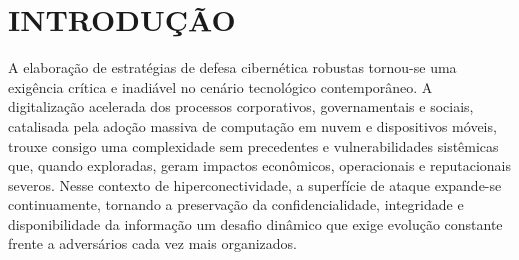 \documentclass[12pt,oneside]{abntex2}
\begin{document}
\pagestyle{tccright}

\pretextual
\begin{capa}
\begin{center}
\bfseries\imprimirinstituicao

\vfill
\textbf{\imprimirautor}

\vfill
{\fontsize{16pt}{19pt}\selectfont\bfseries\imprimirtitulo\par}

\vfill
\imprimirlocal
\par
\imprimirdata
\end{center}
\end{capa}

\begin{folhaderosto}
\thispagestyle{empty}
\setcounter{page}{2}
\begin{center}
\textbf{\imprimirinstituicao}

\vfill
\textbf{\imprimirautor}

\vfill
{\fontsize{16pt}{19pt}\selectfont\bfseries\imprimirtitulo\par}

\vfill
\hfill
\begin{minipage}{0.5\textwidth}
\SingleSpacing
\imprimirpreambulo
\end{minipage}

\vfill
\imprimirlocal
\par
\imprimirdata
\end{center}
\end{folhaderosto}

\tableofcontents*
\cleardoublepage

\textual
\OnehalfSpacing
\linespread{1.5}\selectfont
\pagestyle{tccright}

\chapter{INTRODUÇÃO}

A elaboração de estratégias de defesa cibernética robustas tornou-se uma exigência crítica e inadiável no cenário tecnológico contemporâneo. A digitalização acelerada dos processos corporativos, governamentais e sociais, catalisada pela adoção massiva de computação em nuvem e dispositivos móveis, trouxe consigo uma complexidade sem precedentes e vulnerabilidades sistêmicas que, quando exploradas, geram impactos econômicos, operacionais e reputacionais severos. Nesse contexto de hiperconectividade, a superfície de ataque expande-se continuamente, tornando a preservação da confidencialidade, integridade e disponibilidade da informação um desafio dinâmico que exige evolução constante frente a adversários cada vez mais organizados.
\end{document}
